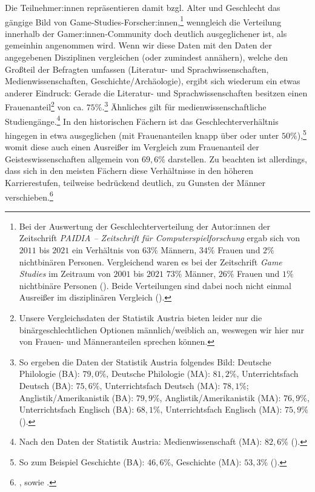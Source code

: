 \documentclass{scrartcl}
\begin{document}
Die Teilnehmer:innen repräsentieren damit bzgl. Alter und Geschlecht das gängige Bild von Game-Studies-Forscher:innen,\footnote{Bei der Auswertung der Geschlechterverteilung der Autor:innen der Zeitschrift \textit{PAIDIA -- Zeitschrift für Computerspielforschung} ergab sich von $2011$ bis $2021$ ein Verhältnis von $63\%$ Männern, $34\%$ Frauen und $2\%$ nichtbinären Personen. Vergleichend waren es bei der Zeitschrift \textit{Game Studies} im Zeitraum von $2001$ bis $2021$ $73\%$ Männer, $26\%$ Frauen und $1\%$ nichtbinäre Personen (\autocite[vgl.][]{unterhuber_offenes_2021}). Beide Verteilungen sind dabei noch nicht einmal Ausreißer im disziplinären Vergleich (\autocite[vgl.][]{west_role_2013}).} wenngleich die Verteilung innerhalb der Gamer:innen-Community doch deutlich ausgeglichener ist, als gemeinhin angenommen wird.\autocite[Vgl. hierzu etwa][S.~13]{rother_spielraume_2025}
Wenn wir diese Daten mit den Daten der angegebenen Disziplinen vergleichen (oder zumindest annähern), welche den Großteil der Befragten umfassen (Literatur- und Sprachwissenschaften, Medienwissenschaften, Geschichte/Archäologie), ergibt sich wiederum ein etwas anderer Eindruck:
Gerade die Literatur- und Sprachwissenschaften besitzen einen Frauenanteil\footnote{Unsere Vergleichsdaten der Statistik Austria bieten leider nur die binärgeschlechtlichen Optionen männlich/weiblich an, weswegen wir hier nur von Frauen- und Männeranteilen sprechen können.} von ca. $75\%$.\footnote{So ergeben die Daten der Statistik Austria folgendes Bild: Deutsche Philologie (BA): $79,0\%$, Deutsche Philologie (MA): $81,2\%$, Unterrichtsfach Deutsch (BA): $75,6\%$, Unterrichtsfach Deutsch (MA): $78,1\%$; Anglistik/Amerikanistik (BA): $79,9\%$, Anglistik/Amerikanistik (MA): $76,9\%$, Unterrichtsfach Englisch (BA): $68,1\%$, Unterrichtsfach Englisch (MA): $75,9\%$ (\autocite[vgl.][]{statistik_austria_studierende_2025}).}
Ähnliches gilt für medienwissenschaftliche Studiengänge.\footnote{Nach den Daten der Statistik Austria: Medienwissenschaft (MA): $82,6\%$ (\autocite[vgl.][]{statistik_austria_studierende_2025}).}
In den historischen Fächern ist das Geschlechterverhältnis hingegen in etwa ausgeglichen (mit Frauenanteilen knapp über oder unter $50\%$),\footnote{So zum Beispiel Geschichte (BA): $46,6\%$, Geschichte (MA): $53,3\%$ (\autocite[vgl.][]{statistik_austria_studierende_2025}).} womit diese auch einen Ausreißer im Vergleich zum Frauenanteil der Geisteswissenschaften allgemein von $69,6\%$ darstellen.\autocite[Vgl. wiederum die Daten der][]{statistik_austria_studierende_2025}
Zu beachten ist allerdings, dass sich in den meisten Fächern diese Verhältnisse in den höheren Karrierestufen, teilweise bedrückend deutlich, zu Gunsten der Männer verschieben.\footnote{\autocite[Vgl. z.\,B.][]{blickenstaff_women_2005}, sowie \autocite[][]{innovative_frauen_im_fokus_leaky_2025}.}
\end{document}

